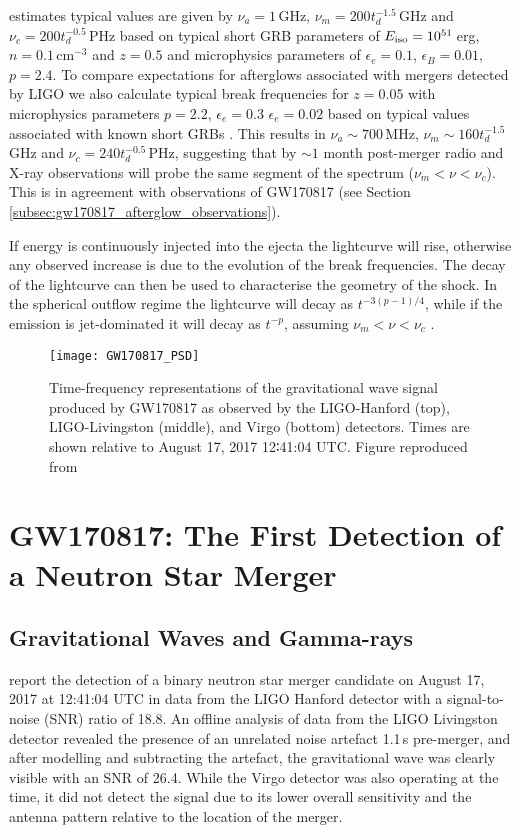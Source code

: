 \citet{2014ARA&A..52...43B} estimates typical values are given by $\nu_a = 1\,$GHz, $\nu_m = 200t_d^{-1.5}$\,GHz and $\nu_c=200t_d^{-0.5}$\,PHz based on typical short GRB parameters of $E_{\rm iso} = 10^{51}$\,erg, $n=0.1$\,cm$^{-3}$ and $z=0.5$ and microphysics parameters of $\epsilon_e=0.1$, $\epsilon_B=0.01$, $p=2.4$. To compare expectations for afterglows associated with mergers detected by LIGO we also calculate typical break frequencies for $z=0.05$ \citep[corresponding to the LIGO horizon;][]{2018LRR....21....3A} with microphysics parameters $p=2.2$, $\epsilon_e=0.3$ $\epsilon_e=0.02$ based on typical values associated with known short GRBs \citep{2019ApJ...880L..23W}. This results in $\nu_a\sim 700\,$MHz, $\nu_m\sim 160t_d^{-1.5}$\,GHz and $\nu_c=240t_d^{-0.5}$\,PHz, suggesting that by $\sim 1$ month post-merger radio and X-ray observations will probe the same segment of the spectrum ($\nu_m<\nu<\nu_c$). This is in agreement with observations of GW170817 (see Section \ref{subsec:gw170817_afterglow_observations}).

If energy is continuously injected into the ejecta the lightcurve will rise, otherwise any observed increase is due to the evolution of the break frequencies. The decay of the lightcurve can then be used to characterise the geometry of the shock. In the spherical outflow regime the lightcurve will decay as $t^{-3(p-1)/4}$, while if the emission is jet-dominated it will decay as $t^{-p}$, assuming $\nu_m<\nu<\nu_c$ \citep{1999ApJ...519L..17S}.

\begin{figure}
    \centering
    \texttt{[image: GW170817\_PSD]}
    \caption[Gravitational Wave signal of GW170817]{Time-frequency representations of the gravitational wave signal produced by GW170817 as observed by the LIGO-Hanford (top), LIGO-Livingston (middle), and Virgo (bottom) detectors. Times are shown relative to August 17, 2017 12∶41:04
UTC. Figure reproduced from \citet{2017PhRvL.119p1101A}}
    \label{fig:GW170817_spectrogram}
\end{figure}

\pagebreak
\section{GW170817: The First Detection of a Neutron Star Merger}
\label{sec:gw170817_intro}
\subsection{Gravitational Waves and Gamma-rays}
\label{subsec:gw170817_gw_grb}
\citet{2017PhRvL.119p1101A} report the detection of a binary neutron star merger candidate on August 17, 2017 at 12:41:04 UTC in data from the LIGO Hanford detector with a signal-to-noise (SNR) ratio of 18.8. An offline analysis of data from the LIGO Livingston detector revealed the presence of an unrelated noise artefact 1.1\,s pre-merger, and after modelling and subtracting the artefact, the gravitational wave was clearly visible with an SNR of 26.4. While the Virgo detector was also operating at the time, it did not detect the signal due to its lower overall sensitivity and the antenna pattern relative to the location of the merger.

